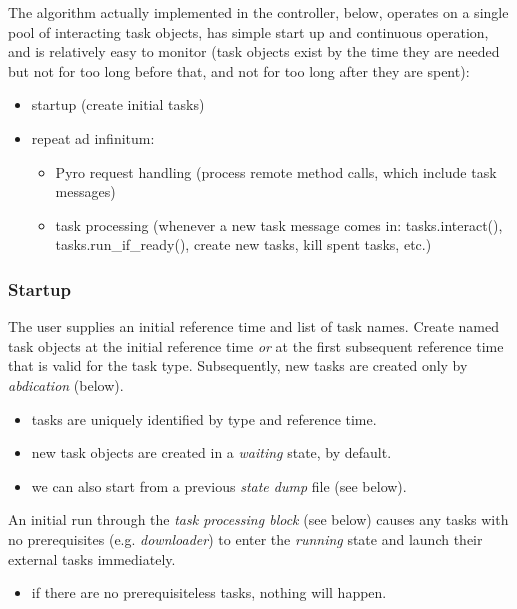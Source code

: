 \documentclass[a4paper,12pt]{amsart}
\begin{document}
The algorithm actually implemented in the controller, below, operates on
a single pool of interacting task objects, has simple start up and
continuous operation, and is relatively easy to monitor (task objects
exist by the time they are needed but not for too long before that, and
not for too long after they are spent): 

\begin{itemize}
    \item startup (create initial tasks)
    \item repeat ad infinitum:
    \begin{itemize}
        \item Pyro request handling (process remote method calls, which
        include task messages)
        \item task processing (whenever a new task message comes in:
        tasks.interact(), tasks.run\_if\_ready(), create new tasks, kill
        spent tasks, etc.)
    \end{itemize}
\end{itemize}


\subsubsection{Startup}

The user supplies an initial reference time and list of task names.
Create named task objects at the initial reference time {\em or} at the
first subsequent reference time that is valid for the task type.
Subsequently, new tasks are created only by {\em abdication} (below).
    \begin{itemize}
        \item tasks are uniquely identified by type and reference time. 
        \item new task objects are created in a {\em waiting} state, by
        default.
        \item we can also start from a previous {\em state dump} file
        (see below).
    \end{itemize}


An initial run through the {\em task processing block} (see below)
causes any tasks with no prerequisites (e.g. {\em downloader}) to enter the
{\em running} state and launch their external tasks immediately.
    \begin{itemize}
    \item if there are no prerequisiteless tasks, nothing will happen.
    \end{itemize}
\end{document}
